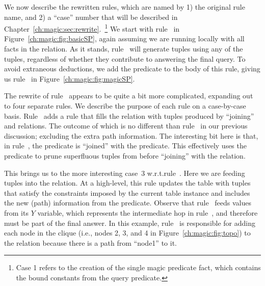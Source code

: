 We now describe the rewritten rules, which are named by 1) the original rule
name, and 2) a ``case'' number that will be described in
Chapter~\ref{ch:magic:sec:rewrite}.~\footnote{Case 1 refers to the creation of
the single magic predicate  fact, which contains the bound
constants from the query predicate.} We start with rule~ in
Figure~\ref{ch:magic:fig:basicSP}, again assuming we are running locally with
all facts in the  relation.  As it stands, rule~ will generate
 tuples using any of the  tuples, regardless of whether they
contribute to answering the final query.  To avoid extraneous deductions, we
add the  predicate to the body of this rule, giving us
rule~ in Figure~\ref{ch:magic:fig:magicSP}.

The rewrite of rule~ appears to be quite a bit more complicated,
expanding out to four separate rules.  We describe the purpose of each rule on
a case-by-case basis.  Rule~ adds a rule that fills the
 relation with tuples produced by ``joining'' 
and  relations.  The outcome of which is no different than
rule~ in our previous discussion; excluding the extra path
information.  The interesting bit here is that, in rule~, the
 predicate is ``joined'' with the  predicate.  This
effectively uses the  predicate to prune superfluous tuples
from  before ``joining'' with the  relation.

This brings us to the more interesting case~$3$ w.r.t.\@ rule~.  Here we
are feeding  tuples into the  relation.  At a
high-level, this rule updates the  table with tuples that
satisfy the constraints imposed by the current  table instance
and includes the new (path) information from the  predicate.  Observe
that rule~ feeds  values from its $Y$ variable,
which represents the intermediate hop in rule~, and therefore must be
part of the final answer.  In this example, rule~ is responsible
for adding each node in the clique (i.e., nodes 2, 3, and 4 in
Figure~\ref{ch:magic:fig:topo}) to the  relation because there
is a path from ``node1'' to it.

